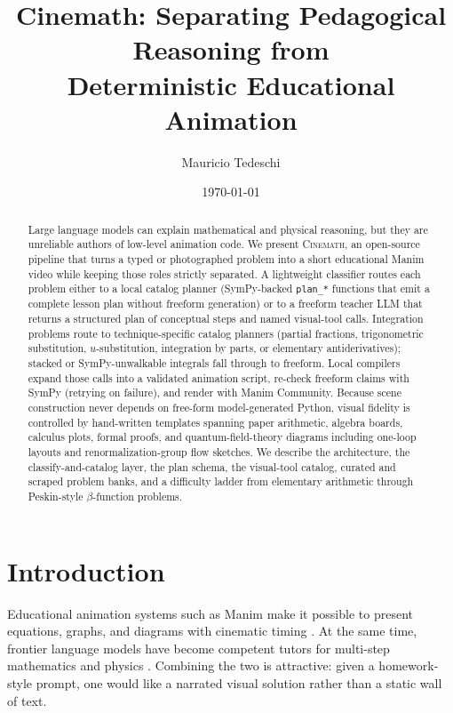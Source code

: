 \documentclass[11pt]{article}
\title{Cinemath: Separating Pedagogical Reasoning from\\
Deterministic Educational Animation}
\author{Mauricio Tedeschi}
\date{\today}
\begin{document}
\maketitle

\begin{abstract}
Large language models can explain mathematical and physical reasoning, but
they are unreliable authors of low-level animation code. We present
\textsc{Cinemath}, an open-source pipeline that turns a typed or photographed
problem into a short educational Manim video while keeping those roles
strictly separated. A lightweight classifier routes each problem either to a
local catalog planner (SymPy-backed \texttt{plan\_*} functions that emit a
complete lesson plan without freeform generation) or to a freeform teacher
LLM that returns a structured plan of conceptual steps and named visual-tool
calls. Integration problems route to technique-specific catalog planners
(partial fractions, trigonometric substitution, $u$-substitution, integration
by parts, or elementary antiderivatives); stacked or SymPy-unwalkable integrals
fall through to freeform. Local compilers expand those calls into a validated animation script,
re-check freeform claims with SymPy (retrying on failure), and render with
Manim Community. Because scene construction never depends on free-form
model-generated Python, visual fidelity is controlled by hand-written
templates spanning paper arithmetic, algebra boards, calculus plots, formal
proofs, and quantum-field-theory diagrams including one-loop layouts and
renormalization-group flow sketches. We describe the architecture, the
classify-and-catalog layer, the plan schema, the visual-tool catalog, curated
and scraped problem banks, and a difficulty ladder from elementary arithmetic
through Peskin-style $\beta$-function problems.
\end{abstract}

\section{Introduction}

Educational animation systems such as Manim make it possible to present
equations, graphs, and diagrams with cinematic timing
\citep{manim2024community}. At the same time, frontier language models have
become competent tutors for multi-step mathematics and physics
\citep{anthropic2024claude}. Combining the two is attractive: given a
homework-style prompt, one would like a narrated visual solution rather than
a static wall of text.
\end{document}
